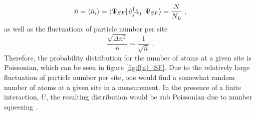 \begin{equation}
	\bar{n} = \braket{\hat{n}_i} = \bra{\Psi_{SF}} \hat{a}_{j}^{\dag} \hat{a}_{j} \ket{\Psi_{SF}} = \frac{N}{N_L} \; ,
\end{equation}
as well as the fluctuations of particle number per site
\begin{equation}
	\frac{\sqrt{\Delta \bar{n}^2}}{\bar{n}} \sim \frac{1}{\sqrt{\bar{n}}} \; .
\end{equation}
Therefore, the probability distribution for the number of atoms at a given site is Poissonian, which can be seen in figure \ref{fig:f(n)_SF}. Due to the relatively large fluctuation of particle number per site, one would find a somewhat random number of atoms at a given site in a measurement. In the presence of a finite interaction, $U$, the resulting distribution would be sub Poissonian due to number squeezing \cite{greiner}.


